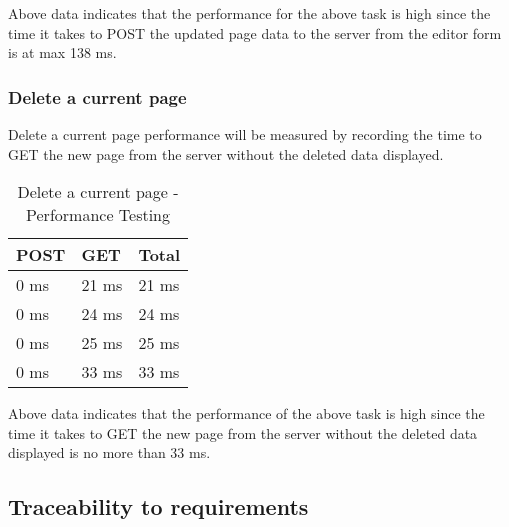 \documentclass[12pt]{article}
\begin{document}
Above data indicates that the performance for the above task is high since the time it takes to POST the updated page data to the server from the editor form is at max 138 ms.

\subsubsection{Delete a current page}
Delete a current page performance will be measured by recording the time to GET the new page from the server without the deleted data displayed. 

\begin{table}[H]
\centering
\caption{Delete a current page - Performance Testing}
\begin{tabular}{|l|l|l|}
\hline
POST & GET   & Total \\ \hline
0 ms & 21 ms & 21 ms \\ \hline
0 ms & 24 ms & 24 ms \\ \hline
0 ms & 25 ms & 25 ms \\ \hline
0 ms & 33 ms & 33 ms \\ \hline
\end{tabular}
\end{table}

Above data indicates that the performance of the above task is high since the time it takes to GET the new page from the server without the deleted data displayed is no more than 33 ms.

\subsection{Traceability to requirements}
\end{document}
